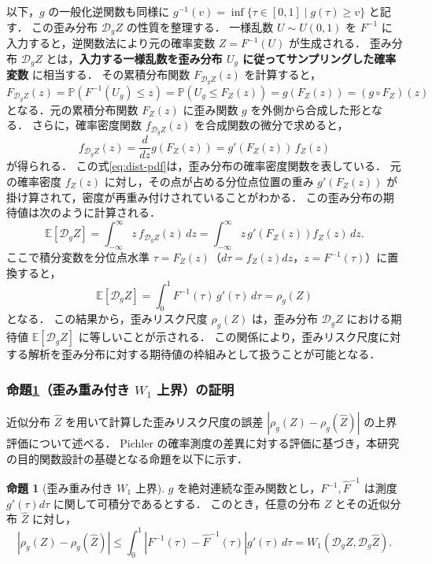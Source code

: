 \documentclass[a4paper,10pt]{jsarticle}
\theoremstyle{definition}
\newtheorem{proposition}{命題}[section]
\newcommand{\Wone}{W_1}
\renewcommand{\Finv}{F^{-1}}
\newcommand{\Fhinv}{\hat{F}^{-1}}
\newcommand{\E}{\mathbb{E}}
\newcommand{\Prob}{\mathbb{P}}
\newcommand{\dist}{\mathcal{D}_g}
\begin{document}
以下，$g$ の一般化逆関数も同様に $g^{-1}(v)=\inf\{\tau\in[0,1]\mid g(\tau)\ge v\}$ と記す．
この歪み分布 $\dist Z$ の性質を整理する．
一様乱数 $U \sim U(0, 1)$ を $\Finv$ に入力すると，逆関数法により元の確率変数 $Z = \Finv(U)$ が生成される．
歪み分布 $\dist Z$ とは，\textbf{入力する一様乱数を歪み分布 $U_g$ に従ってサンプリングした確率変数} に相当する．
その累積分布関数 $F_{\dist Z}(z)$ を計算すると，
\begin{equation}
  F_{\dist Z}(z) = \Prob\left(\Finv(U_g) \le z\right) = \Prob\left(U_g \le F_Z(z)\right) = g(F_Z(z)) = (g \circ F_Z)(z)
  \label{eq:dist-cdf}
\end{equation}
となる．元の累積分布関数 $F_Z(z)$ に歪み関数 $g$ を外側から合成した形となる．
さらに，確率密度関数 $f_{\dist Z}(z)$ を合成関数の微分で求めると，
\begin{equation}
  f_{\dist Z}(z) = \frac{d}{dz} g(F_Z(z)) = g'(F_Z(z))\,f_Z(z)
  \label{eq:dist-pdf}
\end{equation}
が得られる．
この式\eqref{eq:dist-pdf}は，歪み分布の確率密度関数を表している．
元の確率密度 $f_Z(z)$ に対し，その点が占める分位点位置の重み $g'(F_Z(z))$ が掛け算されて，密度が再重み付けされていることがわかる．
この歪み分布の期待値は次のように計算される．
\begin{equation}
  \E[\dist Z] = \int_{-\infty}^\infty z\,f_{\dist Z}(z)\,dz = \int_{-\infty}^\infty z\,g'(F_Z(z))f_Z(z)\,dz.
\end{equation}
ここで積分変数を分位点水準 $\tau = F_Z(z)$（$d\tau = f_Z(z)dz$，$z = \Finv(\tau)$）に置換すると，
\begin{equation}
  \E[\dist Z] = \int_0^1 \Finv(\tau)\,g'(\tau)\,d\tau = \rho_g(Z)
  \label{eq:drm-as-mean}
\end{equation}
となる．
この結果から，歪みリスク尺度 $\rho_g(Z)$ は，歪み分布 $\dist Z$ における期待値 $\E[\dist Z]$ に等しいことが示される．
この関係により，歪みリスク尺度に対する解析を歪み分布に対する期待値の枠組みとして扱うことが可能となる．

\subsubsection{命題\ref{prop:bound}（歪み重み付き $W_1$ 上界）の証明}
近似分布 $\hat Z$ を用いて計算した歪みリスク尺度の誤差 $|\rho_g(Z) - \rho_g(\hat Z)|$ の上界評価について述べる．
Pichler \cite{pichler2013evaluations} の確率測度の差異に対する評価に基づき，本研究の目的関数設計の基礎となる命題を以下に示す．

\begin{proposition}[歪み重み付き $\Wone$ 上界]
\label{prop:bound}
$g$ を絶対連続な歪み関数とし，$\Finv,\Fhinv$ は測度 $g'(\tau)d\tau$ に関して可積分であるとする．
このとき，任意の分布 $Z$ とその近似分布 $\hat Z$ に対し，
\begin{equation}
  \left|\rho_g(Z) - \rho_g(\hat Z)\right| \le \int_0^1 \left|\Finv(\tau) - \Fhinv(\tau)\right| g'(\tau)\,d\tau = \Wone(\dist Z, \dist\hat Z).
  \label{eq:bound}
\end{equation}
\end{proposition}
\end{document}
